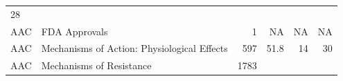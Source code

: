 \documentclass[11pt,]{article}
\begin{document}
\begin{longtable}[]{@{}llrrrr@{}}
\begin{minipage}[t]{0.11\columnwidth}
28\strut
\end{minipage}\tabularnewline
\begin{minipage}[t]{0.06\columnwidth}\raggedright\strut
AAC\strut
\end{minipage} & \begin{minipage}[t]{0.43\columnwidth}\raggedright\strut
FDA Approvals\strut
\end{minipage} & \begin{minipage}[t]{0.04\columnwidth}\raggedleft\strut
1\strut
\end{minipage} & \begin{minipage}[t]{0.08\columnwidth}\raggedleft\strut
NA\strut
\end{minipage} & \begin{minipage}[t]{0.11\columnwidth}\raggedleft\strut
NA\strut
\end{minipage} & \begin{minipage}[t]{0.11\columnwidth}\raggedleft\strut
NA\strut
\end{minipage}\tabularnewline
\begin{minipage}[t]{0.06\columnwidth}\raggedright\strut
AAC\strut
\end{minipage} & \begin{minipage}[t]{0.43\columnwidth}\raggedright\strut
Mechanisms of Action: Physiological Effects\strut
\end{minipage} & \begin{minipage}[t]{0.04\columnwidth}\raggedleft\strut
597\strut
\end{minipage} & \begin{minipage}[t]{0.08\columnwidth}\raggedleft\strut
51.8\strut
\end{minipage} & \begin{minipage}[t]{0.11\columnwidth}\raggedleft\strut
14\strut
\end{minipage} & \begin{minipage}[t]{0.11\columnwidth}\raggedleft\strut
30\strut
\end{minipage}\tabularnewline
\begin{minipage}[t]{0.06\columnwidth}\raggedright\strut
AAC\strut
\end{minipage} & \begin{minipage}[t]{0.43\columnwidth}\raggedright\strut
Mechanisms of Resistance\strut
\end{minipage} & \begin{minipage}[t]{0.04\columnwidth}\raggedleft\strut
1783\strut
\end{minipage} & \begin{minipage}[t]{0.08\columnwidth}\raggedleft\strut

\end{minipage}
\end{longtable}
\end{document}
